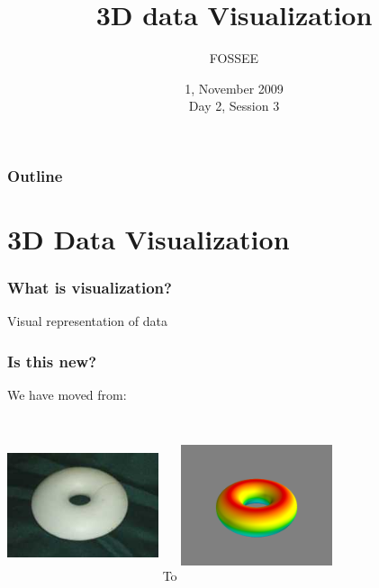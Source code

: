 \documentclass[compress,14pt]{beamer}
\title[]{3D data Visualization}
\author[FOSSEE Team] {FOSSEE}
\institute[IIT Bombay] {Department of Aerospace Engineering\\IIT Bombay}
\date[] {1, November 2009\\Day 2, Session 3}
\begin{document}
\begin{frame}
  \maketitle
\end{frame}

\begin{frame}
  \frametitle{Outline}
  \tableofcontents
\end{frame}

\section{3D Data Visualization}

\begin{frame}
    \frametitle{What is visualization?}
    \Large
    \begin{center}
    Visual representation of data
    \end{center}
\end{frame}


\begin{frame}
    \frametitle{Is this new?}    
    \begin{center}
    We have moved from:
    \end{center}
    \begin{columns}
    \column{}
    \hspace*{-1in}    
    \includegraphics[width=1.75in,height=1.75in, interpolate=true]{data/3832}      
    \column{}\hspace*{-0.25in}
    To
    \column{}
    \hspace*{-1in}
    \includegraphics[width=1.75in, height=1.75in, interpolate=true]{data/torus}  
    \end{columns}
\end{frame}
\end{document}
